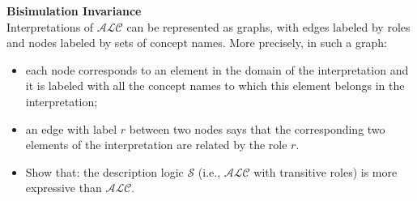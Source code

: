 \documentclass[12pt,a4paper]{article}
\newenvironment{problems}[2][{\color{purple}Question}]{\begin{trivlist}
\item[\hskip \labelsep {\bfseries #1}\hskip \labelsep {\bfseries #2.}]}{\end{trivlist}}
\begin{document}
\begin{problems}{{\color{purple}9 (with 1 bonus mark)}}
\textbf{Bisimulation Invariance}\\
Interpretations of $\mathcal{ALC}$ can be represented as graphs, with edges labeled by roles and nodes labeled by sets of concept names. More precisely, in such a graph:
\begin{itemize}
    \item[] each node corresponds to an element in the domain of the interpretation and it is labeled with all the concept names to which this element belongs in the interpretation;
    \item[] an edge with label $r$ between two nodes says that the corresponding two elements of the interpretation are related by the role $r$.
\end{itemize}
\begin{itemize}
\item Show that: the description logic $\mathcal{S}$ (i.e., $\mathcal{ALC}$ with transitive roles) is more expressive than $\mathcal{ALC}$.
\end{itemize}
\end{problems}
\end{document}
